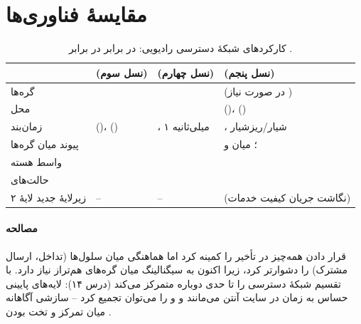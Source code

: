 \documentclass[11pt,a4paper]{article}
\begin{document}
\section{مقایسهٔ فناوری‌ها}
\begin{table}[htbp]
\centering\small
\caption{کارکردهای شبکهٔ دسترسی رادیویی:  در برابر  در برابر .}\label{tab:ran}
\begin{tabularx}{\linewidth}{@{}l Y Y Y@{}}
\toprule
{} &  (نسل سوم) &  (نسل چهارم) &  (نسل پنجم) \\
\midrule
گره‌ها              &             &                    &  (در صورت نیاز ) \\
محل    &                   &                    &  ()،  () \\
زمان‌بند            &  ()،  () & ، ۱ میلی‌ثانیه & ، شیار/ریزشیار \\
پیوند میان گره‌ها   &                     &                       & ؛  میان  و  \\
واسط هسته           &              &                &  \\
حالت‌های    &  &  &  \\
زیرلایهٔ جدید لایهٔ ۲ & --                        & --                           &  (نگاشت جریان کیفیت خدمات) \\
\bottomrule
\end{tabularx}
\end{table}

\paragraph{مصالحه} قرار دادن همه‌چیز در  تأخیر را کمینه کرد اما هماهنگی میان سلول‌ها (تداخل، ارسال
مشترک) را دشوارتر کرد، زیرا اکنون به سیگنالینگ  میان گره‌های هم‌تراز نیاز دارد.  با تقسیم
 شبکهٔ دسترسی را تا حدی دوباره متمرکز می‌کند (درس ۱۴): لایه‌های پایینی حساس به زمان در سایت
آنتن می‌مانند و  و  را می‌توان تجمیع کرد -- سازشی آگاهانه میان تمرکز  و تخت
بودن .
\end{document}
